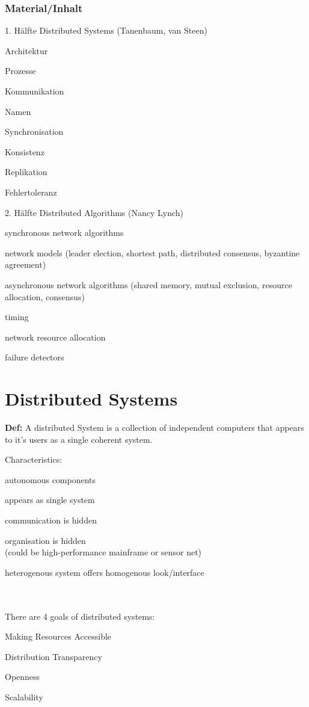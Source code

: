 \documentclass[ngerman,a4paper]{report}
\begin{document}
\subsection{Material/Inhalt}
\begin{compactitem}
\item[1. Hälfte] Distributed Systems (Tanenbaum, van Steen)
	\begin{compactitem}
	\item Architektur
	\item Prozesse
	\item Kommunikation
	\item Namen
	\item Synchronisation
	\item Konsistenz
	\item Replikation
	\item Fehlertoleranz
	\end{compactitem}
\item[2. Hälfte] Distributed Algorithms (Nancy Lynch)
	\begin{compactitem}
	\item synchronous network algorithms
	\item network models (leader election, shortest path, distributed consensus, byzantine agreement)
	\item asynchronous network algorithms (shared memory, mutual exclusion, resource allocation, consensus)
	\item timing
	\item network resource allocation
	\item failure detectors
	\end{compactitem}
\end{compactitem}

\chapter{Distributed Systems}
\textbf{Def:} A distributed System is a collection of independent computers that appears to it's users as a single coherent system.

Characteristics:
\begin{compactitem}
\item autonomous components
\item appears as single system
\item communication is hidden
\item organisation is hidden \\(could be high-performance mainframe or sensor net)
\item heterogenous system offers homogenous look/interface
\end{compactitem}
\ \\
\ \\
There are 4 goals of distributed systems:
\begin{compactenum}
\item Making Resources Accessible
\item Distribution Transparency
\item Openness
\item Scalability
\end{compactenum}
\end{document}
